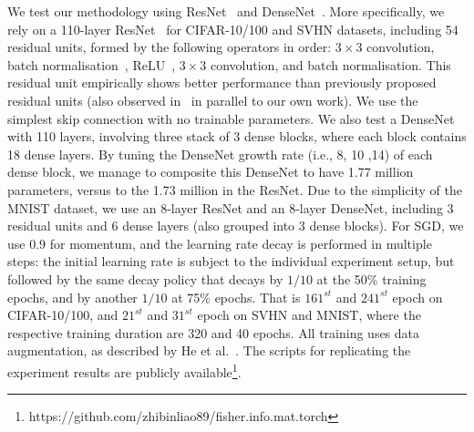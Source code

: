 \documentclass[10pt,journal,compsoc]{IEEEtran}
\begin{document}
We test our methodology using ResNet~\cite{he2016deep} and DenseNet~\cite{huang2016densely}.
More specifically, we rely on a 110-layer ResNet~\cite{he2016deep} for CIFAR-10/100 and SVHN datasets, including 54 residual units, formed by the following operators in order: $3 \times 3$ convolution, batch normalisation~\cite{ioffe2015batch}, ReLU~\cite{nair2010rectified}, $3 \times 3$ convolution, and batch normalisation.
This residual unit empirically shows better performance than previously proposed residual units (also observed in~\cite{gross2016train} in parallel to our own work).
We use the simplest skip connection with no trainable parameters. 
We also test a DenseNet~\cite{huang2016densely} with 110 layers, involving three stack of 3 dense blocks, where each block contains 18 dense layers. 
By tuning the DenseNet growth rate (i.e., 8, 10 ,14) of each dense block, we manage to composite this DenseNet to have 1.77 million parameters, versus to the 1.73 million in the ResNet.
Due to the simplicity of the MNIST dataset, we use an 8-layer ResNet and an 8-layer DenseNet, including 3 residual units and 6 dense layers (also grouped into 3 dense blocks).
For SGD, we use 0.9 for momentum, and the learning rate decay is performed in multiple steps: 
the initial learning rate is subject to the individual experiment setup, but followed by the same decay policy that decays by $1/10$ at the 50\% training epochs, and by another $1/10$ at 75\% epochs.
That is $161^{st}$ and $241^{st}$ epoch on CIFAR-10/100, and  $21^{st}$ and $31^{st}$ epoch on SVHN and MNIST, where the respective training duration are 320 and 40 epochs.
All training uses data augmentation, as described by He et al.~\cite{he2016deep}.
The scripts for replicating the experiment results are publicly available\footnote{https://github.com/zhibinliao89/fisher.info.mat.torch}.
\end{document}
